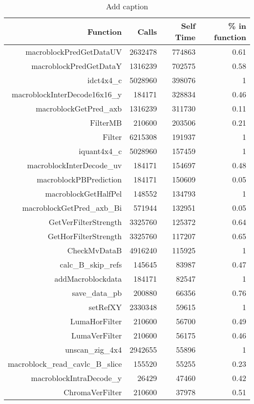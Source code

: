 \begin{table}[htbp]
  \centering
  \caption{Add caption}
    \begin{tabular}{rrrr}
    \addlinespace
    \toprule
    Function & Calls & Self Time & \% in function \\
    \midrule
    macroblockPredGetDataUV & 2632478 & 774863 & 0.61 \\
    macroblockPredGetDataY & 1316239 & 702575 & 0.58 \\
    idct4x4\_c & 5028960 & 398076 & 1 \\
    macroblockInterDecode16x16\_y & 184171 & 328834 & 0.46 \\
    macroblockGetPred\_axb & 1316239 & 311730 & 0.11 \\
    FilterMB & 210600 & 203506 & 0.21 \\
    Filter & 6215308 & 191937 & 1 \\
    iquant4x4\_c & 5028960 & 157459 & 1 \\
    macroblockInterDecode\_uv & 184171 & 154697 & 0.48 \\
    macroblockPBPrediction & 184171 & 150609 & 0.05 \\
    macroblockGetHalfPel & 148552 & 134793 & 1 \\
    macroblockGetPred\_axb\_Bi & 571944 & 132951 & 0.05 \\
    GetVerFilterStrength & 3325760 & 125372 & 0.64 \\
    GetHorFilterStrength & 3325760 & 117207 & 0.65 \\
    CheckMvDataB & 4916240 & 115925 & 1 \\
    calc\_B\_skip\_refs & 145645 & 83987 & 0.47 \\
    addMacroblockdata & 184171 & 82547 & 1 \\
    save\_data\_pb & 200880 & 66356 & 0.76 \\
    setRefXY & 2330348 & 59615 & 1 \\
    LumaHorFilter & 210600 & 56700 & 0.49 \\
    LumaVerFilter & 210600 & 56175 & 0.46 \\
    unscan\_zig\_4x4 & 2942655 & 55896 & 1 \\
    macroblock\_read\_cavlc\_B\_slice & 155520 & 55255 & 0.23 \\
    macroblockIntraDecode\_y & 26429 & 47460 & 0.42 \\
    ChromaVerFilter & 210600 & 37978 & 0.51 \\

\end{tabular}
\end{table}

